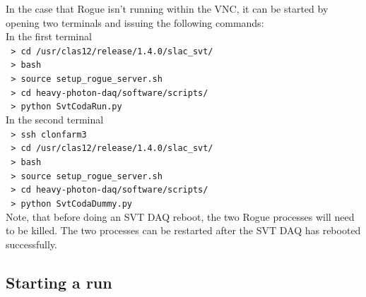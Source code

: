 \documentclass[12pt]{article}
\begin{document}
\noindent
In the case that Rogue isn't running within the VNC, it can be started by 
opening two terminals and issuing the following commands: \\

\noindent
In the first terminal \\

    \noindent
    \texttt{\hspace*{1cm} > cd /usr/clas12/release/1.4.0/slac\_svt/} \\
    \texttt{\hspace*{1cm} > bash} \\
    \texttt{\hspace*{1cm} > source setup\_rogue\_server.sh} \\
    \texttt{\hspace*{1cm} > cd heavy-photon-daq/software/scripts/} \\
    \texttt{\hspace*{1cm} > python SvtCodaRun.py} \\

\noindent
In the second terminal \\

    \noindent
    \texttt{\hspace*{1cm} > ssh clonfarm3} \\
    \texttt{\hspace*{1cm} > cd /usr/clas12/release/1.4.0/slac\_svt/} \\
    \texttt{\hspace*{1cm} > bash} \\
    \texttt{\hspace*{1cm} > source setup\_rogue\_server.sh} \\
    \texttt{\hspace*{1cm} > cd heavy-photon-daq/software/scripts/} \\
    \texttt{\hspace*{1cm} > python SvtCodaDummy.py} \\

Note, that before doing an SVT DAQ reboot, the two Rogue processes will need to 
be killed.  The two processes can be restarted after the SVT DAQ has rebooted
successfully. 

\subsection{Starting a run}
\label{sec:startstop}
\end{document}
